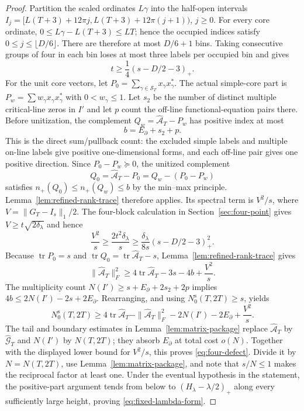 \documentclass[11pt,reqno]{amsart}
\theoremstyle{definition}
\theoremstyle{remark}
\newcommand{\pos}[1]{(#1)_{+}}
\DeclareMathOperator{\tr}{tr}
\begin{document}
\begin{proof}
Partition the scaled ordinates $L\gamma$ into the half-open intervals
$I_j=[L(T+3)+12\pi j,L(T+3)+12\pi(j+1))$, $j\ge0$.  For every core
ordinate, $0\le L\gamma-L(T+3)\le LT$; hence the occupied indices satisfy
$0\le j\le\lfloor D/6\rfloor$.  There are therefore at most $D/6+1$ bins.
Taking consecutive groups of four in each bin loses at most three
labels per occupied bin and gives
\[
 t\ge\frac14\pos{s-D/2-3}.
\]
For the unit core vectors, let $P_0=\sum_{\gamma\in\mathcal S_T}
x_\gamma x_\gamma^*$.  The actual simple-core part is
$P_w=\sum w_\gamma x_\gamma x_\gamma^*$ with $0<w_\gamma\le1$.
Let $s_2$ be the number of distinct multiple critical-line zeros in $I'$ and
let $p$ count the off-line functional-equation pairs there.  Before
unitization, the complement
$Q_w=\widehat{\mathcal A}_T-P_w$ has positive index at most
\[
 b=E_{\partial}+s_2+p.
\]
This is the direct sum/pullback count: the excluded simple labels and
multiple on-line labels give positive one-dimensional forms, and each
off-line pair gives one positive direction.  Since
$P_0-P_w\succeq0$, the unitized complement
\[
 Q_0=\widehat{\mathcal A}_T-P_0=Q_w-(P_0-P_w)
\]
satisfies $n_+(Q_0)\le n_+(Q_w)\le b$ by the min--max principle.
Lemma~\ref{lem:refined-rank-trace} therefore applies.  Its spectral term is
$V^2/s$, where
$V=\|G_T-I_s\|_1/2$.  The four-block calculation in
Section~\ref{sec:four-point} gives
$V\ge t\sqrt{2\delta_\lambda}$ and hence
\[
 \frac{V^2}{s}\ge\frac{2t^2\delta_\lambda}{s}
 \ge\frac{\delta_\lambda}{8s}\pos{s-D/2-3}^2.
\]
Because $\tr P_0=s$ and $\tr Q_0=\tr\widehat{\mathcal A}_T-s$,
Lemma~\ref{lem:refined-rank-trace} gives
\[
 \|\widehat{\mathcal A}_T\|_F^2
 \ge4\tr\widehat{\mathcal A}_T-3s-4b+\frac{V^2}{s}.
\]
The multiplicity count
$N(I')\ge s+E_{\partial}+2s_2+2p$ implies
$4b\le2N(I')-2s+2E_{\partial}$.  Rearranging, and using
$N_0^{\mathrm s}(T,2T)\ge s$, yields
\[
 N_0^{\mathrm s}(T,2T)\ge
 4\tr\widehat{\mathcal A}_T-
 \|\widehat{\mathcal A}_T\|_F^2-2N(I')-2E_{\partial}
 +\frac{V^2}{s}.
\]
The tail and boundary estimates in Lemma~\ref{lem:matrix-package} replace
$\widehat{\mathcal A}_T$ by $\widehat{\mathcal G}_T$ and $N(I')$ by
$N(T,2T)$; they absorb $E_{\partial}$ at total cost $o(N)$.
Together with the displayed lower bound for $V^2/s$, this proves
\eqref{eq:four-defect}.  Divide it by $N=N(T,2T)$, use
Lemma~\ref{lem:matrix-package}, and note that $s/N\le1$ makes the reciprocal
factor at least one.  Under the eventual hypothesis in the statement, the
positive-part argument tends from below to
$\pos{H_\lambda-\lambda/2}$ along every sufficiently large height, proving
\eqref{eq:fixed-lambda-form}.
\end{proof}
\end{document}
